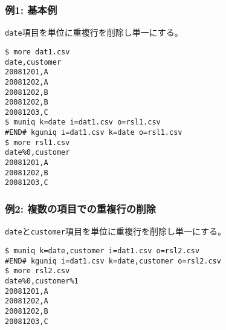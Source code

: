 \subsubsection*{例1: 基本例}

\verb|date|項目を単位に重複行を削除し単一にする。


\begin{Verbatim}[baselinestretch=0.7,frame=single]
$ more dat1.csv
date,customer
20081201,A
20081202,A
20081202,B
20081202,B
20081203,C
$ muniq k=date i=dat1.csv o=rsl1.csv
#END# kguniq i=dat1.csv k=date o=rsl1.csv
$ more rsl1.csv
date%0,customer
20081201,A
20081202,B
20081203,C
\end{Verbatim}
\subsubsection*{例2: 複数の項目での重複行の削除}

\verb|date|と\verb|customer|項目を単位に重複行を削除し単一にする。


\begin{Verbatim}[baselinestretch=0.7,frame=single]
$ muniq k=date,customer i=dat1.csv o=rsl2.csv
#END# kguniq i=dat1.csv k=date,customer o=rsl2.csv
$ more rsl2.csv
date%0,customer%1
20081201,A
20081202,A
20081202,B
20081203,C
\end{Verbatim}
